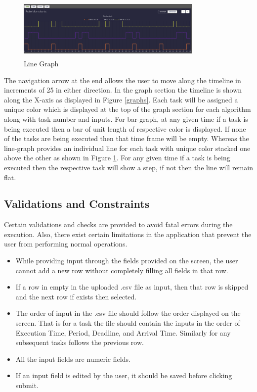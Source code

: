 \documentclass[12pt, conference]{IEEEtran}
\begin{document}
\begin{figure}
\centerline{\includegraphics[width=9cm, height=3cm]{lineGraphDiscussion.png}}
\caption{Line Graph}
\label{lineGraphs}
\end{figure} 

The navigation arrow at the end allows the user to move along the timeline in increments of 25 in either direction. In the graph section the timeline is shown along the X-axis as displayed in Figure \ref{graphs}. Each task will be assigned a unique color which is displayed at the top of the graph section for each algorithm along with task number and inputs. For bar-graph, at any given time if a task is being executed then a bar of unit length of respective color is displayed. If none of the tasks are being executed then that time frame will be empty. Whereas the line-graph provides an individual line for each task with unique color stacked one above the other as shown in Figure \ref{lineGraphs}. For any given time if a task is being executed then the respective task will show a step, if not then the line will remain flat.

\subsection{Validations and Constraints}
Certain validations and checks are provided to avoid fatal errors during the execution. Also, there exist certain limitations in the application that prevent the user from performing normal operations.
\begin{itemize}
    \item While providing input through the fields provided on the screen, the user cannot add a new row without completely filling all fields in that row.
    \item If a row in empty in the uploaded .csv file as input, then that row is skipped and the next row if exists then selected.
    \item The order of input in the .csv file should follow the order displayed on the screen. That is for a task the file should contain the inputs in the order of Execution Time, Period, Deadline, and Arrival Time. Similarly for any subsequent tasks follows the previous row.
    \item All the input fields are numeric fields.
    \item If an input field is edited by the user, it should be saved before clicking submit.
\end{itemize}
\end{document}
